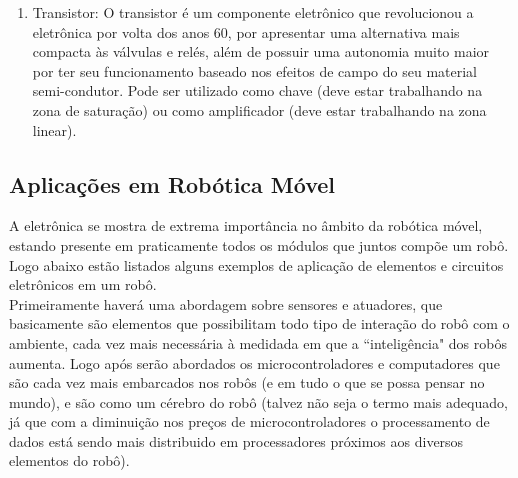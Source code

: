 \begin{enumerate}
\item Transistor:
	O transistor \'e um componente eletr\^onico que revolucionou a eletr\^onica por volta dos anos 60, por apresentar uma alternativa mais compacta \`as v\'alvulas e rel\'es, al\'em de possuir uma autonomia muito maior por ter seu funcionamento baseado nos efeitos de campo do seu material semi-condutor. Pode ser utilizado como chave (deve estar trabalhando na zona de saturaç\~ao) ou como amplificador (deve estar trabalhando na zona linear).
\end{enumerate}

\subsection{Aplicaç\~oes em Rob\'otica M\'ovel}

A eletr\^onica se mostra de extrema import\^ancia no \^ambito da rob\'otica m\'ovel, estando presente em praticamente todos os m\'odulos que juntos comp\~oe um rob\^o.
Logo abaixo est\~ao listados alguns exemplos de aplicaç\~ao de elementos e circuitos eletr\^onicos em um rob\^o.
\\Primeiramente haver\'a uma abordagem sobre sensores e atuadores, que basicamente s\~ao elementos que possibilitam todo tipo de interaç\~ao do rob\^o com o ambiente, cada vez mais necess\'aria \`a medidada em que a ``intelig\^encia" dos rob\^os aumenta. Logo ap\'os ser\~ao abordados os microcontroladores e computadores que s\~ao cada vez mais embarcados nos rob\^os (e em tudo o que se possa pensar no mundo), e s\~ao como um c\'erebro do rob\^o (talvez n\~ao seja o termo mais adequado, j\'a que com a diminuiç\~ao nos preços de microcontroladores o processamento de dados est\'a sendo mais distribuido em processadores pr\'oximos aos diversos elementos do rob\^o).


